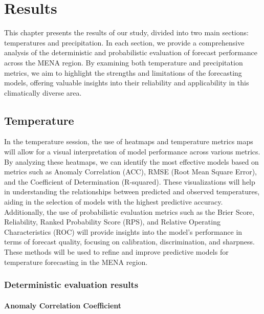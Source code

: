 \chapter{Results}
This chapter presents the results of our study, divided into two main sections: temperatures and precipitation. In each section, we provide a comprehensive analysis of the deterministic and probabilistic evaluation of forecast performance across the MENA region. By examining both temperature and precipitation metrics, we aim to highlight the strengths and limitations of the forecasting models, offering valuable insights into their reliability and applicability in this climatically diverse area.
\section{Temperature}

In the temperature session, the use of heatmaps and temperature metrics maps will allow for a visual interpretation of model performance across various metrics. By analyzing these heatmaps, we can identify the most effective models based on metrics such as Anomaly Correlation (ACC), RMSE (Root Mean Square Error), and the Coefficient of Determination (R-squared). These visualizations will help in understanding the relationships between predicted and observed temperatures, aiding in the selection of models with the highest predictive accuracy. Additionally, the use of probabilistic evaluation metrics such as the Brier Score, Reliability, Ranked Probability Score (RPS), and Relative Operating Characteristics (ROC) will provide insights into the model's performance in terms of forecast quality, focusing on calibration, discrimination, and sharpness. These methods will be used to refine and improve predictive models for temperature forecasting in the MENA region.
\subsection{Deterministic evaluation results}

\subsubsection{Anomaly Correlation Coefficient}


